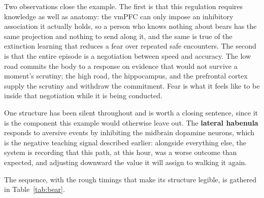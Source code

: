 \documentclass[11pt]{article}
\begin{document}
Two observations close the example. The first is that this regulation requires knowledge as well as anatomy: the vmPFC can only impose an inhibitory association it actually holds, so a person who knows nothing about bears has the same projection and nothing to send along it, and the same is true of the extinction learning that reduces a fear over repeated safe encounters. The second is that the entire episode is a negotiation between speed and accuracy. The low road commits the body to a response on evidence that would not survive a moment's scrutiny; the high road, the hippocampus, and the prefrontal cortex supply the scrutiny and withdraw the commitment. Fear is what it feels like to be inside that negotiation while it is being conducted.

One structure has been silent throughout and is worth a closing sentence, since it is the component this example would otherwise leave out. The \textbf{lateral habenula} responds to aversive events by inhibiting the midbrain dopamine neurons, which is the negative teaching signal described earlier: alongside everything else, the system is recording that this path, at this hour, was a worse outcome than expected, and adjusting downward the value it will assign to walking it again.

The sequence, with the rough timings that make its structure legible, is gathered in Table~\ref{tab:bear}.
\end{document}
